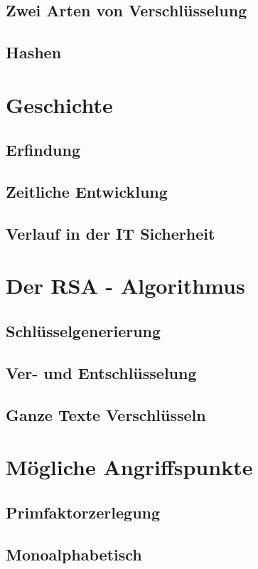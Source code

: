\documentclass[14pt,a4paper]{scrartcl}
\begin{document}
	\subsection{Zwei Arten von Verschlüsselung}
	\subsection{Hashen} %

\section{Geschichte}
	\subsection{Erfindung}
	\subsection{Zeitliche Entwicklung}
	\subsection{Verlauf in der IT Sicherheit}

\section{Der RSA - Algorithmus}
		
	\subsection{Schlüsselgenerierung}
	\subsection{Ver- und Entschlüsselung}
	\subsection{Ganze Texte Verschlüsseln}

\section{Mögliche Angriffspunkte}
	\subsection{Primfaktorzerlegung}
	\subsection{Monoalphabetisch}
\pagebreak
\end{document}
